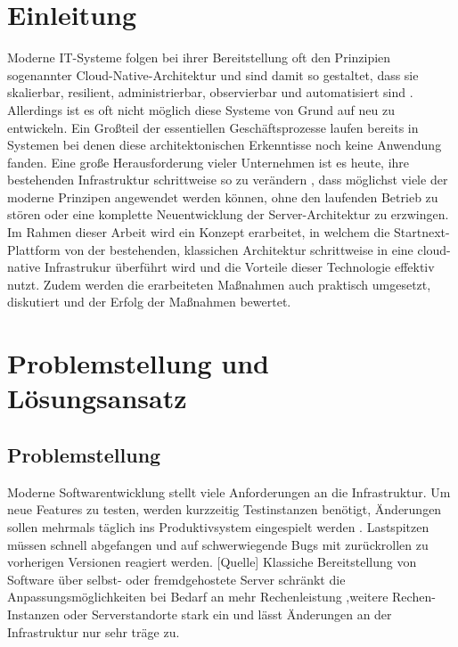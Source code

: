\documentclass[11pt]{scrartcl}
\begin{document}
\section{Einleitung}

Moderne IT-Systeme folgen bei ihrer Bereitstellung oft den Prinzipien sogenannter \glqq Cloud-Native-Architektur\grqq{} 
und sind damit so gestaltet, dass sie skalierbar, resilient, administrierbar, observierbar und automatisiert sind \cite{Lee:2021}. 
Allerdings ist es oft nicht möglich diese Systeme von Grund auf neu zu entwickeln. Ein Großteil der essentiellen Geschäftsprozesse 
laufen bereits in Systemen bei denen diese architektonischen Erkenntisse noch keine Anwendung fanden. Eine große Herausforderung vieler 
Unternehmen ist es heute, ihre bestehenden Infrastruktur schrittweise so zu verändern \cite{Fiedelholtz:2021}, dass möglichst viele der 
moderne Prinzipen angewendet werden können, ohne den laufenden Betrieb zu stören oder eine komplette Neuentwicklung der Server-Architektur 
zu erzwingen. Im Rahmen dieser Arbeit wird ein Konzept erarbeitet, in welchem die Startnext-Plattform von der bestehenden, klassichen Architektur 
schrittweise in eine cloud-native Infrastrukur überführt wird und die Vorteile dieser Technologie effektiv nutzt. Zudem werden die erarbeiteten 
Maßnahmen auch praktisch umgesetzt, diskutiert und der Erfolg der Maßnahmen bewertet.

\section{\label{sec:problem_loesung}Problemstellung und Lösungsansatz}
\subsection{Problemstellung}
Moderne Softwarentwicklung stellt viele Anforderungen an die Infrastruktur. Um neue Features zu testen, werden kurzzeitig Testinstanzen benötigt, Änderungen sollen mehrmals täglich ins Produktivsystem eingespielt werden \cite{IBM:2019}. Lastspitzen müssen schnell abgefangen und auf schwerwiegende Bugs mit zurückrollen zu vorherigen Versionen reagiert werden. [Quelle] Klassiche Bereitstellung von Software über selbst- oder fremdgehostete Server schränkt die Anpassungsmöglichkeiten bei Bedarf an mehr Rechenleistung ,weitere Rechen-Instanzen oder Serverstandorte stark ein und lässt Änderungen an der Infrastruktur nur sehr träge zu. \newline
\end{document}
